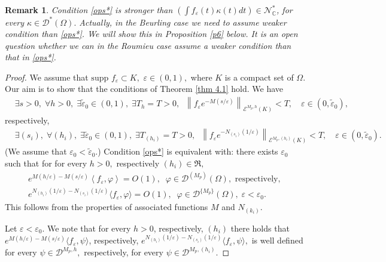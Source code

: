 \documentclass[sn-mathphys,Numbered]{sn-jnl}%
\theoremstyle{thmstyleone}%
\theoremstyle{thmstyletwo}%
\newtheorem{remark}{Remark}%
\theoremstyle{thmstylethree}%
\begin{document}
\begin{remark} Condition \eqref{ops*} is stronger than $\left(\int f_\varepsilon(t)\kappa(t)dt\right) \in\mathcal N^\ast_\mathbb{C}$, for every $\kappa\in \mathcal{D}^\ast(\Omega).$ Actually, in the Beurling case we need to assume weaker condition than \eqref{ops*}. We will show this in Proposition \ref{p6} below. It is an open question whether we can in the Roumieu case assume a weaker condition than that in \eqref{ops*}.
\end{remark}
\begin{proof}
We assume that $\mbox{supp }f_\varepsilon\subset K,$ $ \varepsilon\in (0,1),$ 
where $K$ is a compact set of $\Omega.$ Our aim is to show that the conditions of Theorem \ref{thm 4.1} hold. We have 
\begin{align*}%
&\exists s>0,\; \forall h>0,\; \exists \tilde\varepsilon_0\in(0,1),\; \exists T_h=T>0,\;\; \left\| f_\varepsilon e^{-M(s/\varepsilon)}\right\|_{\mathcal{E}^{M_p,h}(K)} <T,\quad \varepsilon\in (0,\tilde\varepsilon_0),
\end{align*}
respectively,
\begin{align*}%
&\exists (s_i),\; \forall (h_i),\; \exists \tilde\varepsilon_0\in(0,1),\; \exists T_{(h_i)}=T>0,\;\; \left\| f_\varepsilon e^{-N_{(s_i)}(1/\varepsilon)}\right\|_{\mathcal{E}^{M_p,(h_i)}(K)} <T,\quad \varepsilon\in (0,\tilde\varepsilon_0).
\end{align*}
(We assume that $\varepsilon_0<\tilde\varepsilon_0$.) Condition \eqref{ops*} is equivalent with: there exists $\varepsilon_0$ such that for for every $h>0,$ respectively $(h_i)\in \mathfrak{R},$ 
\begin{align*} \label{nov11}
e^{M(h/\varepsilon)-M(s/\varepsilon)}\left\langle f_\varepsilon,\varphi\right\rangle=O(1),\;\; \varphi\in\mathcal D^{(M_p)}(\Omega),\text{ respectively, }\\
e^{N_{(h_i)}(1/\varepsilon)-N_{(s_i)}(1/\varepsilon)}\langle f_\varepsilon,\varphi\rangle=O(1),\;\; \varphi\in\mathcal D^{\{M_p\}}(\Omega),\;\varepsilon<\varepsilon_0.
\end{align*}
 This follows from the  properties of associated functions $M$ and $N_{(k_i)}.$

Let $\varepsilon<\varepsilon_0$. We note that for every $h>0$, respectively, $(h_i)$ there holds that
$e^{M(h/\varepsilon)-M(s/\varepsilon)}\langle f_\varepsilon, \psi \rangle$, respectively, $e^{N_{(h_i)}(1/\varepsilon)-N_{(s_i)}(1/\varepsilon)}\langle f_\varepsilon, \psi \rangle,$
is well defined for every $\psi\in \mathcal{D}^{M_p,h},$
respectively, for every $\psi\in \mathcal{D}^{M_p,(h_i)}.$


\end{proof}
\end{document}
